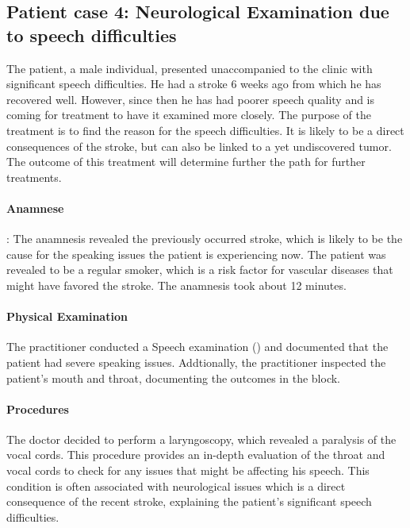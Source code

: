 \subsection{Patient case 4: Neurological Examination due to speech difficulties}\label{subsec:patient-case-4:-neurological-examination-due-to-speech-difficulties}
The patient, a male individual, presented unaccompanied to the clinic with significant speech difficulties.
He had a stroke 6 weeks ago from which he has recovered well.
However, since then he has had poorer speech quality and is coming for treatment to have it examined more closely.
The purpose of the treatment is to find the reason for the speech difficulties.
It is likely to be a direct consequences of the stroke, but can also be linked to a yet undiscovered tumor.
The outcome of this treatment will determine further the path for further treatments.

\paragraph{Anamnese}:
The anamnesis revealed the previously occurred stroke, which is likely to be the cause for the speaking issues the patient is experiencing now.
The patient was revealed to be a regular smoker, which is a risk factor for vascular diseases that might have favored the stroke.
The anamnesis took about 12 minutes.

\paragraph{Physical Examination}
The practitioner conducted a Speech examination () and documented that the patient had severe speaking issues.
Addtionally, the practitioner inspected the patient's mouth and throat, documenting the outcomes in the  block.

\paragraph{Procedures}
The doctor decided to perform a laryngoscopy, which revealed a paralysis of the vocal cords.
This procedure provides an in-depth evaluation of the throat and vocal cords to check for any issues that might be affecting his speech.
This condition is often associated with neurological issues which is a direct consequence of the recent stroke,
explaining the patient's significant speech difficulties.



